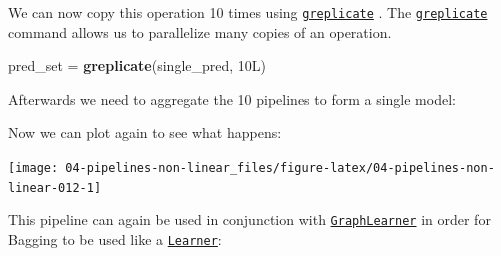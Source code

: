 \documentclass[]{scrbook}
\newenvironment{Shaded}{\begin{snugshade}}{\end{snugshade}}
\newcommand{\DataTypeTok}[1]{\textcolor[rgb]{0.13,0.29,0.53}{#1}}
\newcommand{\KeywordTok}[1]{\textcolor[rgb]{0.13,0.29,0.53}{\textbf{#1}}}
\newcommand{\NormalTok}[1]{#1}
\newcommand{\OperatorTok}[1]{\textcolor[rgb]{0.81,0.36,0.00}{\textbf{#1}}}
\newcommand{\OtherTok}[1]{\textcolor[rgb]{0.56,0.35,0.01}{#1}}
\newcommand{\StringTok}[1]{\textcolor[rgb]{0.31,0.60,0.02}{#1}}
\renewenvironment{Shaded} {\begin{snugshade}\small} {\end{snugshade}}
\begin{document}
We can now copy this operation 10 times using \href{https://mlr3pipelines.mlr-org.com/reference/greplicate.html}{\texttt{greplicate}} .
The \href{https://mlr3pipelines.mlr-org.com/reference/greplicate.html}{\texttt{greplicate}} command allows us to parallelize many copies of an operation.

\begin{Shaded}
\begin{Highlighting}[]
\NormalTok{pred_set =}\StringTok{ }\KeywordTok{greplicate}\NormalTok{(single_pred, 10L)}
\end{Highlighting}
\end{Shaded}

Afterwards we need to aggregate the 10 pipelines to form a single model:

\begin{Shaded}
\end{Shaded}

Now we can plot again to see what happens:

\begin{Shaded}
\end{Shaded}

\begin{center}\texttt{[image: 04-pipelines-non-linear\_files/figure-latex/04-pipelines-non-linear-012-1]} \end{center}

This pipeline can again be used in conjunction with \href{https://mlr3pipelines.mlr-org.com/reference/mlr_learners_graph.html}{\texttt{GraphLearner}} in order for Bagging to be used like a \href{https://mlr3.mlr-org.com/reference/Learner.html}{\texttt{Learner}}:

\begin{Shaded}
\end{Shaded}
\end{document}

